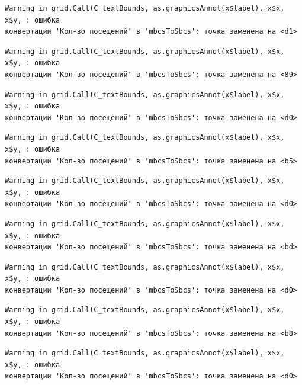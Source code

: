 \documentclass[
  letterpaper,
  DIV=11,
  numbers=noendperiod]{scrreprt}
\begin{document}
\begin{verbatim}
Warning in grid.Call(C_textBounds, as.graphicsAnnot(x$label), x$x, x$y, : ошибка
конвертации 'Кол-во посещений' в 'mbcsToSbcs': точка заменена на <d1>
\end{verbatim}

\begin{verbatim}
Warning in grid.Call(C_textBounds, as.graphicsAnnot(x$label), x$x, x$y, : ошибка
конвертации 'Кол-во посещений' в 'mbcsToSbcs': точка заменена на <89>
\end{verbatim}

\begin{verbatim}
Warning in grid.Call(C_textBounds, as.graphicsAnnot(x$label), x$x, x$y, : ошибка
конвертации 'Кол-во посещений' в 'mbcsToSbcs': точка заменена на <d0>
\end{verbatim}

\begin{verbatim}
Warning in grid.Call(C_textBounds, as.graphicsAnnot(x$label), x$x, x$y, : ошибка
конвертации 'Кол-во посещений' в 'mbcsToSbcs': точка заменена на <b5>
\end{verbatim}

\begin{verbatim}
Warning in grid.Call(C_textBounds, as.graphicsAnnot(x$label), x$x, x$y, : ошибка
конвертации 'Кол-во посещений' в 'mbcsToSbcs': точка заменена на <d0>
\end{verbatim}

\begin{verbatim}
Warning in grid.Call(C_textBounds, as.graphicsAnnot(x$label), x$x, x$y, : ошибка
конвертации 'Кол-во посещений' в 'mbcsToSbcs': точка заменена на <bd>
\end{verbatim}

\begin{verbatim}
Warning in grid.Call(C_textBounds, as.graphicsAnnot(x$label), x$x, x$y, : ошибка
конвертации 'Кол-во посещений' в 'mbcsToSbcs': точка заменена на <d0>
\end{verbatim}

\begin{verbatim}
Warning in grid.Call(C_textBounds, as.graphicsAnnot(x$label), x$x, x$y, : ошибка
конвертации 'Кол-во посещений' в 'mbcsToSbcs': точка заменена на <b8>
\end{verbatim}

\begin{verbatim}
Warning in grid.Call(C_textBounds, as.graphicsAnnot(x$label), x$x, x$y, : ошибка
конвертации 'Кол-во посещений' в 'mbcsToSbcs': точка заменена на <d0>
\end{verbatim}
\end{document}
